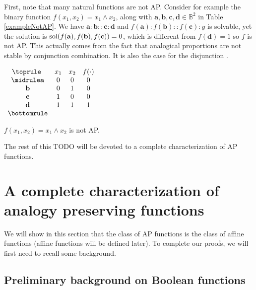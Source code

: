 \noindent

First, note that many natural functions are not AP. Consider for example the
binary function $f(x_1,x_2)= x_1 \wedge x_2$, along with $\mathbf{a},
\mathbf{b}, \mathbf{c}, \mathbf{d} \in \mathbb{B}^2$ in Table
\ref{exampleNotAP}.  We have $\mathbf{a} : \mathbf{b} :: \mathbf{c} :
\mathbf{d}$ and $f(\mathbf{a}) : f(\mathbf{b}) :: f(\mathbf{c}) : y$ is
solvable, yet the solution is $\text{sol}(f(\mathbf{a}), f(\mathbf{b}),
f(\mathbf{c}))=0$, which  is different from $f(\mathbf{d})=1$ so $f$ is not AP.
This actually comes from the fact that analogical proportions are not stable by
conjunction combination. It is also the case for the disjunction
\cite{PraRic14}.

\begin{table}[ht]
  \center
$\begin{array}{cccc}
  \toprule
  ~ & x_1 & x_2 & f(\cdot) \\
  \midrule
  \mathbf{a} & 0 & 0 & 0\\
  \mathbf{b} & 0 & 1 & 0\\
  \mathbf{c} & 1 & 0 & 0\\
  \mathbf{d} & 1 & 1 & 1\\
  \bottomrule
\end{array}
$\bigskip
\caption{$f(x_1,x_2)= x_1 \wedge x_2$ is not AP.}
\label{exampleNotAP}
\end{table}

The rest of this TODO will be devoted to a complete characterization of AP
functions.

\section{A complete characterization of analogy preserving functions}

We will show in this section that the class of AP functions is the class of
affine functions (affine functions will be defined later). To complete our
proofs, we will first need to recall some background.

\subsection{Preliminary background on Boolean functions}

